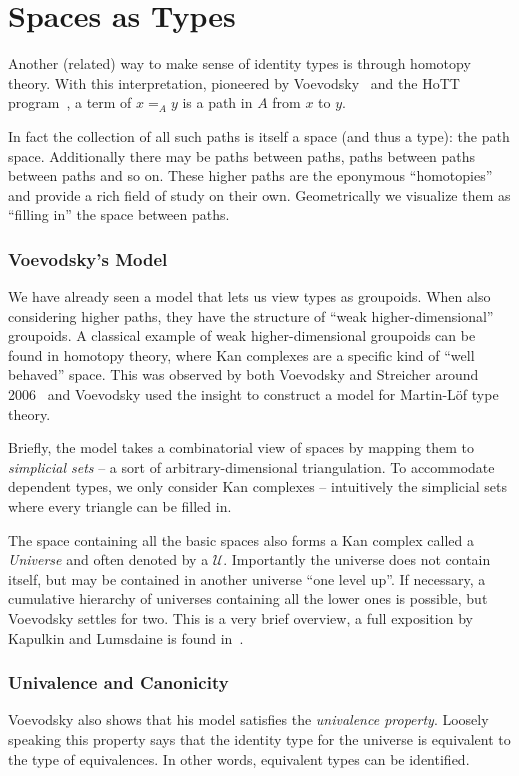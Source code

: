 \section{Spaces as Types}\label{sec:spaces}

Another (related) way to make sense of identity types is through homotopy theory. With
this interpretation, pioneered by Voevodsky~\cite{voevodsky2014} and the HoTT
program~\cite{hottbook}, a term of $x =_A y$ is a path in $A$ from $x$ to
$y$.

In fact the collection of all such paths is itself a space (and thus a type):
the path space. Additionally there may be paths between paths, paths between
paths between paths and so on. These higher paths are the eponymous
``homotopies'' and provide a rich field of study on their own.
Geometrically we visualize them as ``filling in'' the space between paths.

\subsubsection{Voevodsky's Model}
We have already seen a model that lets us view types as groupoids. When also
considering higher paths, they have the structure of ``weak higher-dimensional''
groupoids. A classical example of weak higher-dimensional groupoids can be found
in homotopy theory, where Kan complexes are a specific kind of ``well
behaved'' space. This was observed by both Voevodsky and Streicher around
2006~\cite{streicher2014sset} and Voevodsky used the insight to construct a
model for Martin-L\"of type theory.

Briefly, the model takes a combinatorial view of spaces by mapping them to
\emph{simplicial sets} -- a sort of arbitrary-dimensional triangulation. To
accommodate dependent types, we only consider Kan complexes -- intuitively the
simplicial sets where every triangle can be filled in.

The space containing all the basic spaces also forms a Kan complex
called a \emph{Universe} and often denoted by a $\mathcal{U}$.
Importantly the universe does not contain itself, but
may be contained in another universe ``one level up''. If necessary, a
cumulative hierarchy of universes containing all the lower ones is possible, but
Voevodsky settles for two. This is a very brief overview, a full exposition by
Kapulkin and Lumsdaine is found in~\cite{kapulkin2012}.

\subsubsection{Univalence and Canonicity}%
Voevodsky also shows that his model satisfies the \emph{univalence property}.
Loosely speaking this property says that the identity type for the universe is
equivalent to the type of equivalences. In other words, equivalent types can be
identified.

